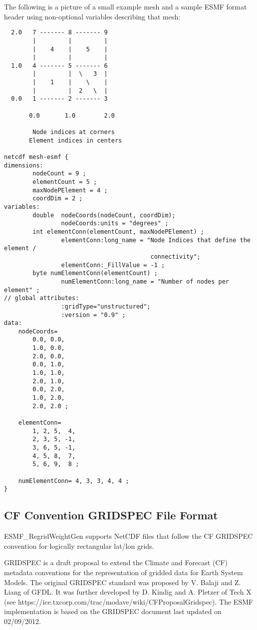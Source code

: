 The following is a picture of a small example mesh and a sample ESMF format header using non-optional variables describing that mesh:

\begin{verbatim}
  2.0   7 ------- 8 ------- 9
        |         |         |
        |    4    |    5    |
        |         |         |
  1.0   4 ------- 5 ------- 6
        |         |  \   3  |
        |    1    |    \    |
        |         |  2   \  |
  0.0   1 ------- 2 ------- 3

       0.0       1.0        2.0

        Node indices at corners
       Element indices in centers

netcdf mesh-esmf {
dimensions:
        nodeCount = 9 ;
        elementCount = 5 ;
        maxNodePElement = 4 ;
        coordDim = 2 ;
variables:
        double  nodeCoords(nodeCount, coordDim);
                nodeCoords:units = "degrees" ;
        int elementConn(elementCount, maxNodePElement) ;
                elementConn:long_name = "Node Indices that define the element /
                                         connectivity";
                elementConn:_FillValue = -1 ;
        byte numElementConn(elementCount) ;
                numElementConn:long_name = "Number of nodes per element" ;
// global attributes:
                :gridType="unstructured";
                :version = "0.9" ;
data:
    nodeCoords=
        0.0, 0.0,
        1.0, 0.0,
        2.0, 0.0,
        0.0, 1.0,
        1.0, 1.0,
        2.0, 1.0,
        0.0, 2.0,
        1.0, 2.0,
        2.0, 2.0 ;

    elementConn=
        1, 2, 5,  4,
        2, 3, 5, -1,
        3, 6, 5, -1,
        4, 5, 8,  7,
        5, 6, 9,  8 ;

    numElementConn= 4, 3, 3, 4, 4 ;
}

\end{verbatim}

\subsection{CF Convention GRIDSPEC File Format}\label{sec:fileformat:gridspec}

ESMF\_RegridWeightGen supports NetCDF files that follow the CF GRIDSPEC convention for logically rectangular lat/lon grids.

GRIDSPEC is a draft proposal to extend the Climate and Forecast (CF) metadata conventions for the representation of gridded data for Earth System Models.  The original GRIDSPEC standard was proposed by V. Balaji and Z. Liang of GFDL.  It was further developed by D. Kindig and A. Pletzer of Tech X (see  {https://ice.txcorp.com/trac/modave/wiki/CFProposalGridspec}).  The ESMF implementation is based on the GRIDSPEC document last updated on 02/09/2012.

